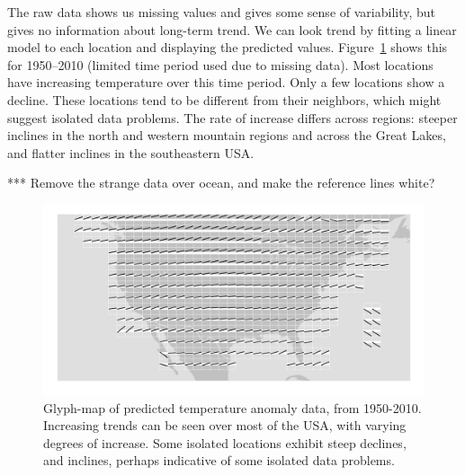 \documentclass[oneside]{article}
\begin{document}
The raw data shows us missing values and gives some sense of variability, but gives no information about long-term trend. We can look trend by fitting a linear model to each location and displaying the predicted values. Figure~\ref{fig:gistemp-pred} shows this for 1950--2010 (limited time period used due to missing data). Most locations have increasing temperature over this time period. Only a few locations show a decline. These locations tend to be different from their neighbors, which might suggest isolated data problems. The rate of increase differs across regions: steeper inclines in the north and western mountain regions and across the Great Lakes, and flatter inclines in the southeastern USA.

*** Remove the strange data over ocean, and make the reference lines white?

\begin{figure}[htbp]
  \centering
  \includegraphics[width=1\linewidth]{gistemp-pred}%

  \caption{Glyph-map of predicted temperature anomaly data, from
    1950-2010. Increasing trends can be seen over most of the USA,
    with varying degrees of increase. Some isolated locations exhibit
    steep declines, and inclines, perhaps indicative of some isolated
    data problems.}
  \label{fig:gistemp-pred}
\end{figure}


\end{document}
